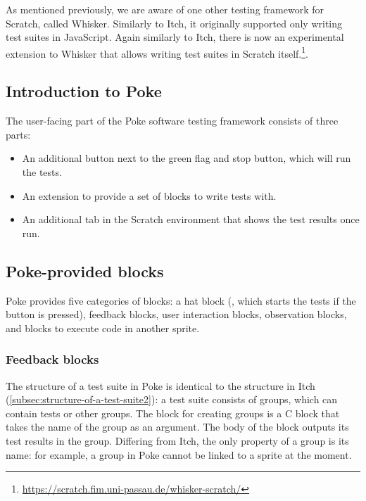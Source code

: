 \documentclass[../main]{subfiles}
\begin{document}
As mentioned previously, we are aware of one other testing framework for Scratch, called Whisker.
Similarly to Itch, it originally supported only writing test suites in JavaScript.
Again similarly to Itch, there is now an experimental extension to Whisker that allows writing test suites in Scratch itself.\footnote{\url{https://scratch.fim.uni-passau.de/whisker-scratch/}}.

\subsection{Introduction to Poke}\label{subsec:introduction-to-poke}

The user-facing part of the Poke software testing framework consists of three parts:

\begin{itemize}
    \item An additional button next to the green flag and stop button, which will run the tests.
    \item An extension to provide a set of blocks to write tests with.
    \item An additional tab in the Scratch environment that shows the test results once run.
\end{itemize}


\subsection{Poke-provided blocks}\label{subsec:poke-provided-blocks}

Poke provides five categories of blocks: a hat block (, which starts the tests if the button is pressed), feedback blocks, user interaction blocks, observation blocks, and blocks to execute code in another sprite.

\subsubsection{Feedback blocks}

\begin{scratch}[scale=0.7]
\end{scratch}

The structure of a test suite in Poke is identical to the structure in Itch (\cref{subsec:structure-of-a-test-suite2}): a test suite consists of groups, which can contain tests or other groups.
The block for creating groups is a C block that takes the name of the group as an argument.
The body of the block outputs its test results in the group.
Differing from Itch, the only property of a group is its name: for example, a group in Poke cannot be linked to a sprite at the moment.
\end{document}
